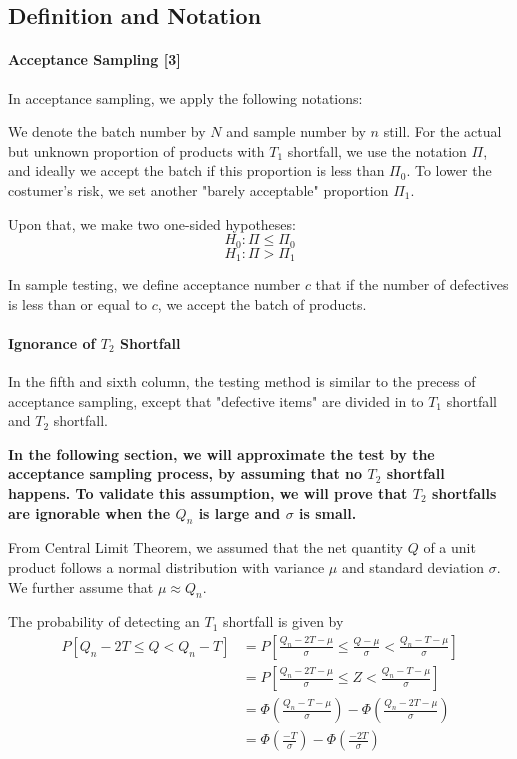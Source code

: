 \documentclass[a4paper]{article}
\begin{document}
\subsection{Definition and Notation}
\paragraph{Acceptance Sampling [3]}
In acceptance sampling, we apply the following notations:

We denote the batch number by $N$ and sample number by $n$ still. For the actual but unknown proportion of products with $T_1$ shortfall, we use the notation $\Pi$, and ideally we accept the batch if this proportion is less than $\Pi_0$. To lower the costumer's risk, we set another "barely acceptable" proportion $\Pi_1$.

Upon that, we make two one-sided hypotheses:
$$H_0: \Pi\leq \Pi_0$$
$$H_1: \Pi>\Pi_1$$

In sample testing, we define acceptance number $c$ that if the number of defectives is less than or equal to $c$, we accept the batch of products.

\paragraph{Ignorance of $T_2$ Shortfall}
In the fifth and sixth column, the testing method is similar to the precess of acceptance sampling, except that "defective items" are divided in to $T_1$ shortfall and $T_2$ shortfall.

\textbf{In the following section, we will approximate the test by the acceptance sampling process, by assuming that no $T_2$ shortfall happens. To validate this assumption, we will prove that $T_2$ shortfalls are ignorable when the $Q_n$ is large and $\sigma$ is small.}

From Central Limit Theorem, we assumed that the net quantity $Q$ of a unit product follows a normal distribution with variance $\mu$ and standard deviation $\sigma$. We further assume that $\mu\approx Q_n$.

The probability of detecting an $T_1$ shortfall is given by
\begin{align*}
P[Q_n-2T \leq Q < Q_n-T]
&= P[\frac{Q_n-2T-\mu}{\sigma} \leq \frac{Q-\mu}{\sigma} < \frac{Q_n-T-\mu}{\sigma}]\\
&= P[\frac{Q_n-2T-\mu}{\sigma} \leq Z < \frac{Q_n-T-\mu}{\sigma}]\\
&= \Phi(\frac{Q_n-T-\mu}{\sigma})-\Phi(\frac{Q_n-2T-\mu}{\sigma})\\
&= \Phi(\frac{-T}{\sigma})-\Phi(\frac{-2T}{\sigma})\\
\end{align*}
\end{document}

